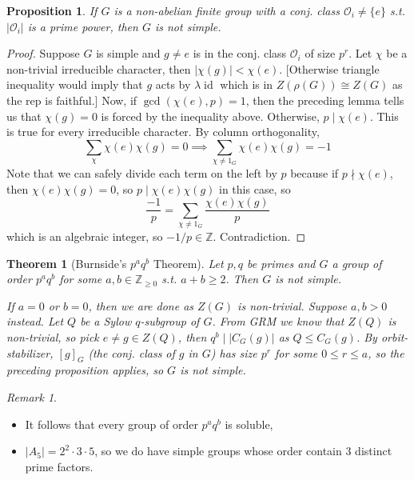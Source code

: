 \documentclass{article}
\theoremstyle{definition}
\theoremstyle{remark}
\newtheorem{rem}{Remark}
\theoremstyle{plain}
\newtheorem{thm}[defn]{Theorem}
\newtheorem{prop}[defn]{Proposition}
\newcommand{\ZZ}{\mathbb{Z}}
\newcommand{\id}{\operatorname{id}}
\begin{document}
\begin{prop}
    If $G$ is a non-abelian finite group with a conj. class $\mathcal O_i\neq\{e\}$ s.t. $|\mathcal O_i|$ is a prime power, then $G$ is not simple.
\end{prop}
\begin{proof}
    Suppose $G$ is simple and $g\neq e$ is in the conj. class $\mathcal O_i$ of size $p^r$.
    Let $\chi$ be a non-trivial irreducible character, then $|\chi(g)|<\chi(e)$. [Otherwise triangle inequality would imply that $g$ acts by $\lambda\id$ which is in $Z(\rho(G))\cong Z(G)$ as the rep is faithful.]
    Now, if $\gcd(\chi(e),p)=1$, then the preceding lemma tells us that $\chi(g)=0$ is forced by the inequality above. Otherwise, $p\mid \chi(e)$.
    This is true for every irreducible character. By column orthogonality, 
    \[\sum_\chi\chi(e)\chi(g)=0\implies \sum_{\chi\neq1_G}\chi(e)\chi(g)=-1\]
    Note that we can safely divide each term on the left by $p$ because if $p\nmid \chi(e)$, then $\chi(e)\chi(g)=0$, so $p\mid \chi(e)\chi(g)$ in this case, so
    \[\dfrac{-1}{p}=\sum_{\chi\neq1_G}\dfrac{\chi(e)\chi(g)}{p}\]
    which is an algebraic integer, so $-1/p\in\ZZ$. Contradiction.
\end{proof}
\begin{thm}[Burnside's $p^aq^b$ Theorem]
    Let $p,q$ be primes and $G$ a group of order $p^aq^b$ for some $a,b\in\ZZ_{\ge0}$ s.t. $a+b\ge 2$. Then $G$ is not simple.
    
    If $a=0$ or $b=0$, then we are done as $Z(G)$ is non-trivial. Suppose $a,b>0$ instead. Let $Q$ be a Sylow $q$-subgroup of $G$. From GRM we know that $Z(Q)$ is non-trivial, so pick $e\neq g\in Z(Q)$, then $q^b\mid|C_G(g)|$ as $Q\le C_G(g)$. By orbit-stabilizer, $[g]_G$ (the conj. class of $g$ in $G$) has size $p^r$ for some $0\le r\le a$, so the preceding proposition applies, so $G$ is not simple.
\end{thm}
\begin{rem}
    \begin{itemize}
        \item It follows that every group of order $p^aq^b$ is soluble, 
        \item $|A_5|=2^2\cdot 3\cdot 5$, so we do have simple groups whose order contain $3$ distinct prime factors.
    \end{itemize}
\end{rem}
\end{document}
